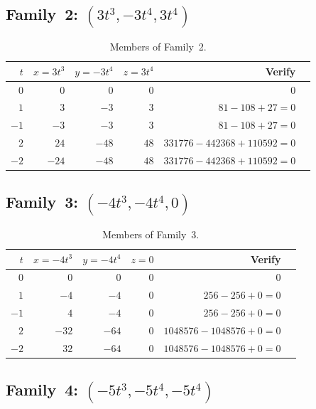 \documentclass[12pt,a4paper]{article}
\theoremstyle{definition}
\begin{document}
\subsection{Family~2: $(3t^3, -3t^4, 3t^4)$}

\begin{table}[h]
\centering
\caption{Members of Family~2.}
\label{tab:family2}
\renewcommand{\arraystretch}{1.2}
\begin{tabular}{rrrrrc}
\toprule
$t$ & $x = 3t^3$ & $y = -3t^4$ & $z = 3t^4$ & Verify \\
\midrule
$0$  & $0$    & $0$    & $0$    & $0$ \\
$1$  & $3$    & $-3$   & $3$    & $81-108+27=0$ \\
$-1$ & $-3$   & $-3$   & $3$    & $81-108+27=0$ \\
$2$  & $24$   & $-48$  & $48$   & $331776-442368+110592=0$ \\
$-2$ & $-24$  & $-48$  & $48$   & $331776-442368+110592=0$ \\
\bottomrule
\end{tabular}
\end{table}

\subsection{Family~3: $(-4t^3, -4t^4, 0)$}

\begin{table}[h]
\centering
\caption{Members of Family~3.}
\label{tab:family3}
\renewcommand{\arraystretch}{1.2}
\begin{tabular}{rrrrrc}
\toprule
$t$ & $x = -4t^3$ & $y = -4t^4$ & $z = 0$ & Verify \\
\midrule
$0$  & $0$    & $0$    & $0$ & $0$ \\
$1$  & $-4$   & $-4$   & $0$ & $256-256+0=0$ \\
$-1$ & $4$    & $-4$   & $0$ & $256-256+0=0$ \\
$2$  & $-32$  & $-64$  & $0$ & $1048576-1048576+0=0$ \\
$-2$ & $32$   & $-64$  & $0$ & $1048576-1048576+0=0$ \\
\bottomrule
\end{tabular}
\end{table}

\subsection{Family~4: $(-5t^3, -5t^4, -5t^4)$}
\end{document}
